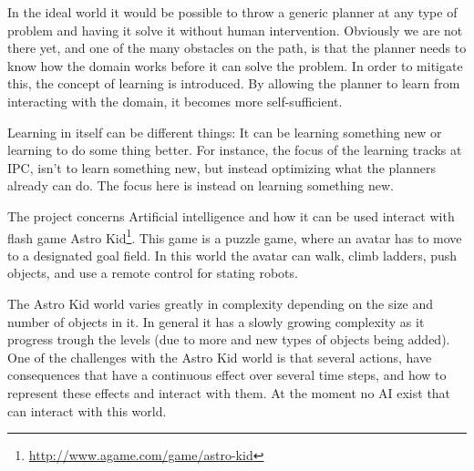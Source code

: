 %


	
	In the ideal world it would be possible to throw a generic planner at any type of problem and having it solve it without human intervention. Obviously we are not there yet, and one of the many obstacles on the path, is that the planner needs to know how the domain works before it can solve the problem. In order to mitigate this, the concept of learning is introduced. By allowing the planner to learn from interacting with the domain, it becomes more self-sufficient.

	Learning in itself can be different things: It can be learning something new or learning to do some thing better. For instance, the focus of the learning tracks at IPC, isn't to learn something new, but instead optimizing what the planners already can do. The focus here is instead on learning something new. %



	The project concerns Artificial intelligence and how it can be used interact with flash game Astro Kid\footnote{\url{http://www.agame.com/game/astro-kid}}. This game is a puzzle game, where an avatar has to move to a designated goal field. In this world the avatar can walk, climb ladders, push objects, and use a remote control for stating robots.
	
	The Astro Kid world varies greatly in complexity depending on the size and number of objects in it. In general it has a slowly growing complexity as it progress trough the levels (due to more and new types of objects being added). One of the challenges with the Astro Kid world is that several actions, have consequences that have a continuous effect over several time steps, and how to represent these effects and interact with them. At the moment no AI exist that can interact with this world. 

